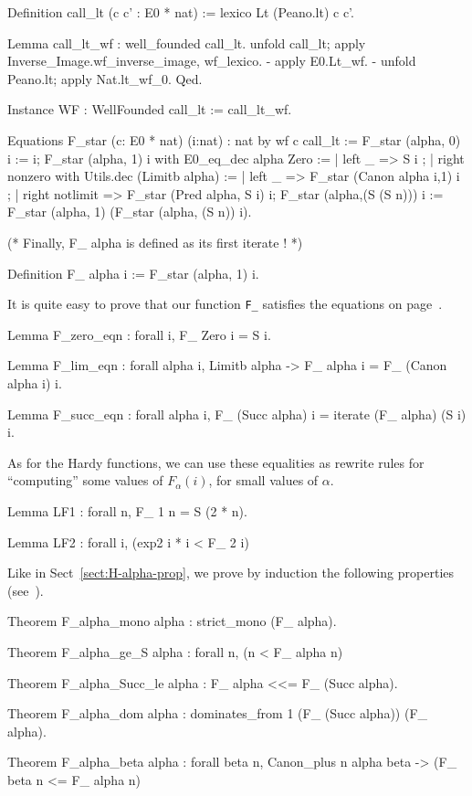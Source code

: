 \begin{Coqsrc}
Definition call_lt (c c' : E0 * nat) :=
  lexico Lt (Peano.lt) c c'.

Lemma call_lt_wf : well_founded call_lt.
  unfold call_lt; apply Inverse_Image.wf_inverse_image,  wf_lexico.
  -  apply E0.Lt_wf.
  -  unfold Peano.lt; apply Nat.lt_wf_0. 
Qed.

Instance WF : WellFounded call_lt := call_lt_wf.

Equations  F_star (c: E0 * nat) (i:nat) :  nat by wf  c call_lt :=
    F_star (alpha, 0) i := i;
    F_star (alpha, 1) i
      with E0_eq_dec alpha Zero :=
           { | left _ => S i ;
             | right nonzero
                 with Utils.dec (Limitb alpha) :=
                 { | left _ => F_star (Canon alpha i,1) i ;
                   | right notlimit =>
                     F_star (Pred alpha, S i)  i}};
    F_star (alpha,(S (S n))) i :=
               F_star (alpha, 1) (F_star (alpha, (S n)) i).

(* Finally, F_ alpha is defined as its first iterate ! *)

Definition F_  alpha i := F_star (alpha, 1) i.
\end{Coqsrc}

It is quite easy to prove that our function \texttt{F\_} satisfies the equations on page~\pageref{sect:F-equations}.

\begin{Coqsrc}
Lemma F_zero_eqn : forall i, F_ Zero i = S i.

Lemma F_lim_eqn : forall alpha i,  Limitb alpha ->
                               F_ alpha i = F_ (Canon alpha i) i.

Lemma F_succ_eqn : forall alpha i,
    F_ (Succ alpha) i = iterate (F_ alpha) (S i) i.
\end{Coqsrc}

As for the Hardy functions, we can use these equalities as rewrite rules for
``computing'' some values of $F_\alpha(i)$, for small values of $\alpha$.

\begin{Coqsrc}
Lemma LF1 : forall n,  F_ 1 n = S (2 * n).

Lemma LF2 : forall i, (exp2 i * i < F_ 2 i)%
\end{Coqsrc}


Like in Sect~\ref{sect:H-alpha-prop}, we prove by induction the following properties (see~\cite{KS81}). 

\begin{Coqsrc}
Theorem F_alpha_mono alpha : strict_mono (F_ alpha).
 
Theorem F_alpha_ge_S alpha : forall n, (n < F_ alpha n)%

Theorem F_alpha_Succ_le alpha : F_ alpha <<= F_ (Succ alpha).

Theorem F_alpha_dom alpha : dominates_from 1 (F_ (Succ alpha)) (F_ alpha).

Theorem F_alpha_beta alpha : forall beta n, Canon_plus n alpha beta -> 
                                        (F_ beta n <= F_ alpha n)%
\end{Coqsrc}

